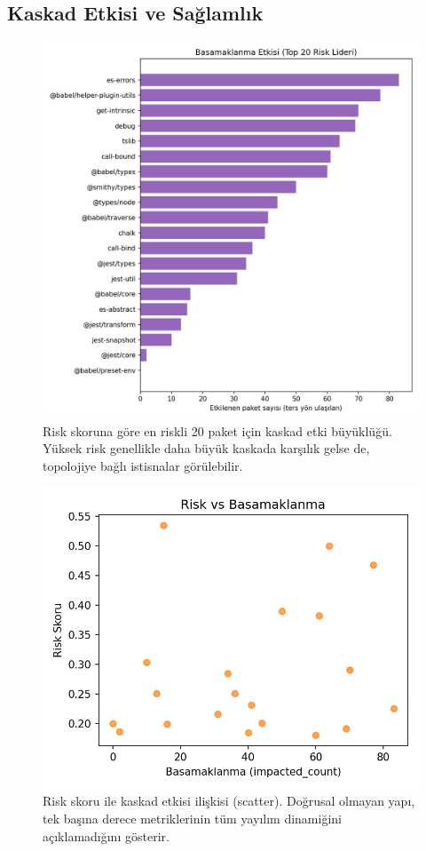 \documentclass[11pt,a4paper]{article}
\begin{document}
\subsection{Kaskad Etkisi ve Sağlamlık}
\begin{figure}[H]
  \centering
  \includegraphics{cascade_impact_top20.png}
  \caption{Risk skoruna göre en riskli 20 paket için kaskad etki büyüklüğü. Yüksek risk genellikle daha büyük kaskada karşılık gelse de, topolojiye bağlı istisnalar görülebilir.}
\end{figure}

\begin{figure}[H]
  \centering
  \includegraphics{risk_vs_cascade.png}
  \caption{Risk skoru ile kaskad etkisi ilişkisi (scatter). Doğrusal olmayan yapı, tek başına derece metriklerinin tüm yayılım dinamiğini açıklamadığını gösterir.}
\end{figure}
\end{document}

